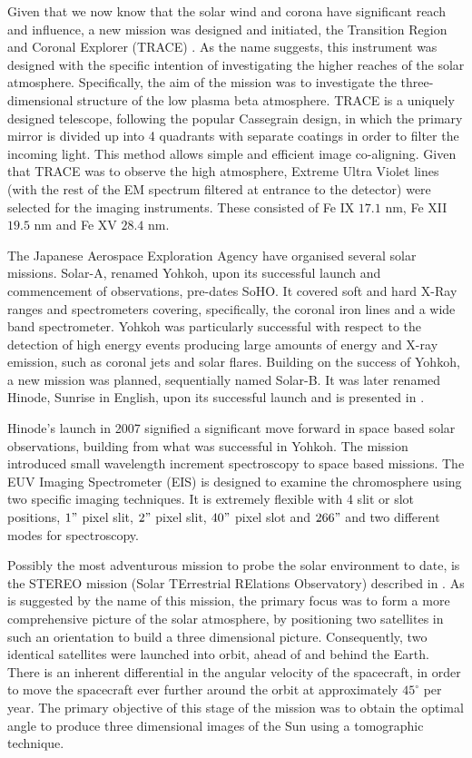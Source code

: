 Given that we now know that the solar wind and corona have significant reach and influence, a new mission was designed and initiated, the Transition Region and Coronal Explorer (TRACE) \cite{Gaeng1998}.
As the name suggests, this instrument was designed with the specific intention of investigating the higher reaches of the solar atmosphere.
Specifically, the aim of the mission was to investigate the three-dimensional structure of the low plasma beta atmosphere.
TRACE is a uniquely designed telescope, following the popular Cassegrain design, in which the primary mirror is divided up into 4 quadrants with separate coatings in order to filter the incoming light.
This method allows simple and efficient image co-aligning.
Given that TRACE was to observe the high atmosphere, Extreme Ultra Violet lines (with the rest of the EM spectrum filtered at entrance to the detector) were selected for the imaging instruments. 
These consisted of Fe IX $17.1$ nm, Fe XII $19.5$ nm and Fe XV $28.4$ nm.




The Japanese Aerospace Exploration Agency have organised several solar missions.
Solar-A, renamed Yohkoh, \cite{Tsuneta1991} upon its successful launch and commencement of observations, pre-dates SoHO.
It covered soft and hard X-Ray ranges and spectrometers covering, specifically, the coronal iron lines and a wide band spectrometer. 
Yohkoh was particularly successful with respect to the detection of high energy events producing large amounts of energy and X-ray emission, such as coronal jets and solar flares.
Building on the success of Yohkoh, a new mission was planned, sequentially named Solar-B.
It was later renamed Hinode, Sunrise in English, upon its successful launch and is presented in \cite{Kosugi2007}.
 
Hinode's launch in 2007 signified a significant move forward in space based solar observations, building from what was successful in Yohkoh.
The mission introduced small wavelength increment spectroscopy to space based missions.
The EUV Imaging Spectrometer (EIS) is designed to examine the chromosphere using two specific imaging techniques.
It is extremely flexible with 4 slit or slot positions, $1"$ pixel slit, $2"$ pixel slit, $40"$ pixel slot and $266"$ and two different modes for spectroscopy.

Possibly the most adventurous mission to probe the solar environment to date, is the STEREO mission (Solar TErrestrial RElations Observatory) described in \cite{Kaiser2008}.
As is suggested by the name of this mission, the primary focus was to form a more comprehensive picture of the solar atmosphere, by positioning two satellites in such an orientation to build a three dimensional picture.
Consequently, two identical satellites were launched into orbit, ahead of and behind the Earth.
There is an inherent differential in the angular velocity of the spacecraft, in order to move the spacecraft ever further around the orbit at approximately $45^\circ$ per year.
The primary objective of this stage of the mission was to obtain the optimal angle to produce three dimensional images of the Sun using a tomographic technique.


